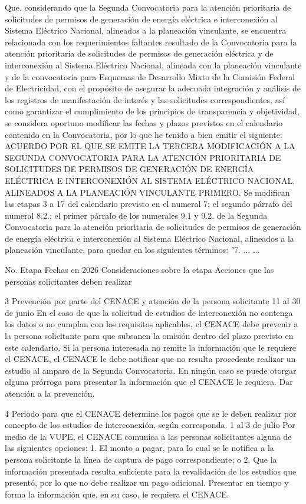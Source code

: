 Que, considerando que la Segunda Convocatoria para la atención prioritaria de solicitudes de permisos de generación de energía eléctrica e interconexión al Sistema Eléctrico Nacional, alineados a la planeación vinculante, se encuentra relacionada con los requerimientos faltantes resultado de la Convocatoria para la atención prioritaria de solicitudes de permisos de generación eléctrica y de interconexión al Sistema Eléctrico Nacional, alineada con la planeación vinculante y de la convocatoria para Esquemas de Desarrollo Mixto de la Comisión Federal de Electricidad, con el propósito de asegurar la adecuada integración y análisis de los registros de manifestación de interés y las solicitudes correspondientes, así como garantizar el cumplimiento de los principios de transparencia y objetividad, se considera oportuno modificar las fechas y plazos previstos en el calendario contenido en la Convocatoria, por lo que he tenido a bien emitir el siguiente:
ACUERDO POR EL QUE SE EMITE LA TERCERA MODIFICACIÓN A LA SEGUNDA CONVOCATORIA PARA LA ATENCIÓN PRIORITARIA DE SOLICITUDES DE PERMISOS DE GENERACIÓN DE ENERGÍA ELÉCTRICA E INTERCONEXIÓN AL SISTEMA ELÉCTRICO NACIONAL, ALINEADOS A LA PLANEACIÓN VINCULANTE
PRIMERO. Se modifican las etapas 3 a 17 del calendario previsto en el numeral 7; el segundo párrafo del numeral 8.2.; el primer párrafo de los numerales 9.1 y 9.2. de la Segunda Convocatoria para la atención prioritaria de solicitudes de permisos de generación de energía eléctrica e interconexión al Sistema Eléctrico Nacional, alineados a la planeación vinculante, para quedar en los siguientes términos:
"7. ...
...\par
No.
 Etapa
 Fechas en 2026
 Consideraciones sobre la etapa
 Acciones que las personas solicitantes deben realizar
 
 3
 Prevención por parte del CENACE y atención de la persona solicitante
 11 al 30 de junio
 En el caso de que la solicitud de estudios de interconexión no contenga los datos o no cumplan con los requisitos aplicables, el CENACE debe prevenir a la persona solicitante para que subsanen la omisión dentro del plazo previsto en este calendario.
Si la persona interesada no remite la información que le requiere el CENACE, el CENACE le debe notificar que no resulta procedente realizar un estudio al amparo de la Segunda Convocatoria.
En ningún caso se puede otorgar alguna prórroga para presentar la información que el CENACE le requiera.
 Dar atención a la prevención.
 
 4
 Periodo para que el CENACE determine los pagos que se le deben realizar por concepto de los estudios de interconexión, según corresponda.
 1 al 3 de julio
 Por medio de la VUPE, el CENACE comunica a las personas solicitantes alguna de las siguientes opciones:
1. El monto a pagar, para lo cual se le notifica a la persona solicitante la línea de captura de pago correspondiente; o
2. Que la información presentada resulta suficiente para la revalidación de los estudios que presentó, por lo que no debe realizar un pago adicional.
 Presentar en tiempo y forma la información que, en su caso, le requiera el CENACE.
 
